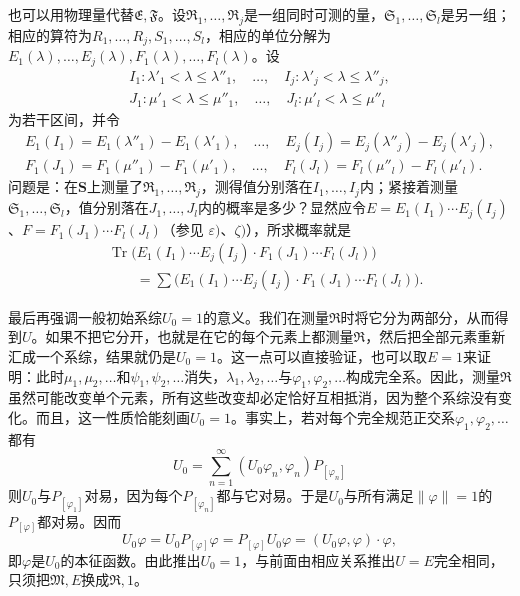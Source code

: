 \documentclass[fontsize=13pt,twoside,openany,headings=normal,parskip=false,bookmarkpackage=false,DIV=calc]{scrbook}
\begin{document}
也可以用物理量代替$\mathfrak E,\allowbreak \mathfrak F$。设$\mathfrak R_1,\allowbreak \ldots,\allowbreak \mathfrak R_j$是一组同时可测的量，$\mathfrak S_1,\allowbreak \ldots,\allowbreak \mathfrak S_l$是另一组；相应的算符为$R_1,\allowbreak \ldots,\allowbreak R_j,\allowbreak S_1,\allowbreak \ldots,\allowbreak S_l$，相应的单位分解为$E_1(\lambda),\allowbreak \ldots,\allowbreak E_j(\lambda),\allowbreak F_1(\lambda),\allowbreak \ldots,\allowbreak F_l(\lambda)$。设
\begin{gather*}
I_1:\lambda'_1<\lambda\leq\lambda''_1,\quad\ldots,\quad I_j:\lambda'_j<\lambda\leq\lambda''_j,\\
J_1:\mu'_1<\lambda\leq\mu''_1,\quad\ldots,\quad J_l:\mu'_l<\lambda\leq\mu''_l
\end{gather*}
为若干区间，并令
\begin{gather*}
E_1(I_1)=E_1(\lambda''_1)-E_1(\lambda'_1),\quad\ldots,\quad E_j(I_j)=E_j(\lambda''_j)-E_j(\lambda'_j),\\
F_1(J_1)=F_1(\mu''_1)-F_1(\mu'_1),\quad\ldots,\quad F_l(J_l)=F_l(\mu''_l)-F_l(\mu'_l).
\end{gather*}
问题是：在$\boldsymbol{S}$上测量了$\mathfrak R_1,\allowbreak \ldots,\allowbreak \mathfrak R_j$，测得值分别落在$I_1,\allowbreak \ldots,\allowbreak I_j$内；紧接着测量$\mathfrak S_1,\allowbreak \ldots,\allowbreak \mathfrak S_l$，值分别落在$J_1,\allowbreak \ldots,\allowbreak J_l$内的概率是多少？显然应令$E=E_1(I_1)\cdots E_j(I_j)$、$F=F_1(J_1)\cdots F_l(J_l)$（参见 \hyperref[post:III.5.epsilon]{$\varepsilon)$}、\hyperref[post:III.5.zeta]{$\zeta)$}），所求概率就是
\begin{align*}
&\operatorname{Tr}\bigl(E_1(I_1)\cdots E_j(I_j)\cdot F_1(J_1)\cdots F_l(J_l)\bigr)\\
&\qquad=\sum\bigl(E_1(I_1)\cdots E_j(I_j)\cdot F_1(J_1)\cdots F_l(J_l)\bigr).
\end{align*}

最后再强调一般初始系综$U_0=1$的意义。我们在测量$\mathfrak R$时将它分为两部分，从而得到$U$。如果不把它分开，也就是在它的每个元素上都测量$\mathfrak R$，然后把全部元素重新汇成一个系综，结果就仍是$U_0=1$。这一点可以直接验证，也可以取$E=1$来证明：此时$\mu_1,\allowbreak \mu_2,\allowbreak \ldots$和$\psi_1,\allowbreak \psi_2,\allowbreak \ldots$消失，$\lambda_1,\allowbreak \lambda_2,\allowbreak \ldots$与$\varphi_1,\allowbreak \varphi_2,\allowbreak \ldots$构成完全系。因此，测量$\mathfrak R$虽然可能改变单个元素，所有这些改变却必定恰好互相抵消，因为整个系综没有变化。而且，这一性质恰能刻画$U_0=1$。事实上，若对每个完全规范正交系$\varphi_1,\allowbreak \varphi_2,\allowbreak \ldots$都有
\[
U_0=\sum_{n=1}^{\infty}(U_0\varphi_n,\varphi_n)P_{[\varphi_n]}
\]
则$U_0$与$P_{[\varphi_1]}$对易，因为每个$P_{[\varphi_n]}$都与它对易。于是$U_0$与所有满足$\|\varphi\|=1$的$P_{[\varphi]}$都对易。因而
\[
U_0\varphi=U_0P_{[\varphi]}\varphi=P_{[\varphi]}U_0\varphi=(U_0\varphi,\varphi)\cdot\varphi,
\]
即$\varphi$是$U_0$的本征函数。由此推出$U_0=1$，与前面由相应关系推出$U=E$完全相同，只须把$\mathfrak M,\allowbreak E$换成$\mathfrak R,\allowbreak 1$。
\end{document}
